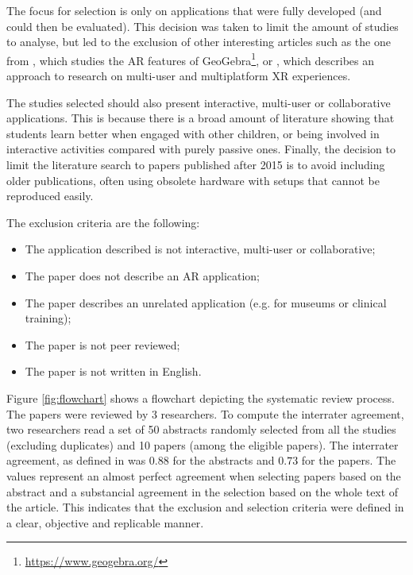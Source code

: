 The focus for selection is only on applications that were fully developed (and could then be evaluated). This decision was taken to limit the amount of studies to analyse, but led to the exclusion of other interesting articles such as the one from \cite{osypova2021improving}, which studies the AR features of GeoGebra\footnote{\url{https://www.geogebra.org/}}, or \citep{tumler2022multi}, which describes an approach to research on multi-user and multiplatform XR experiences.

The studies selected should also present interactive, multi-user or collaborative applications. This is because there is a broad amount of literature showing that students learn better when engaged with other children, or being involved in interactive activities compared with purely passive ones. Finally, the decision to limit the literature search to papers published after 2015 is to avoid including older publications, often using obsolete hardware with setups that cannot be reproduced easily.

The exclusion criteria are the following:

\begin{itemize}
    \item The application described is not interactive, multi-user or collaborative;
    \item The paper does not describe an AR application;
    \item The paper describes an unrelated application (e.g. for museums or clinical training);
    \item The paper is not peer reviewed;
    \item The paper is not written in English.
\end{itemize}

Figure \ref{fig:flowchart} shows a flowchart depicting the systematic review process. The \papersToRead papers were reviewed by 3 researchers. To compute the interrater agreement, two researchers read a set of 50 abstracts randomly selected from all the studies (excluding duplicates) and 10 papers (among the \papersToRead eligible papers). The interrater agreement, as defined in \cite{cohen1960coefficient} was $0.88$ for the abstracts and $0.73$ for the papers. The values represent\citep{mchugh2012interrater} an almost perfect agreement when selecting papers based on the abstract and a substancial agreement in the selection based on the whole text of the article. This indicates that the exclusion and selection criteria were defined in a clear, objective and replicable manner.


